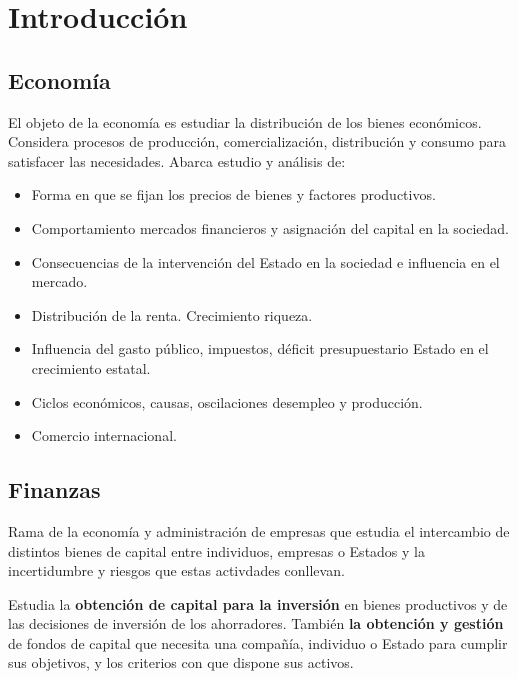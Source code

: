 \documentclass[
10pt, %
a4paper, %
oneside, %
headinclude,footinclude, %
BCOR5mm, %
]{scrartcl}
\newcommand{\n}[1]{\textbf{#1}}
\newcounter{ex}
\begin{document}
\pagestyle{scrheadings} %

\newpage
\tableofcontents
\newpage




\section*{Introducción}

	\subsection*{Economía}
		El objeto de la economía es estudiar la distribución de los bienes económicos. Considera procesos de producción, comercialización, distribución y consumo para satisfacer las necesidades. Abarca estudio y análisis de:
		\begin{itemize}
			\item Forma en que se fijan los precios de bienes y factores productivos.
			\item Comportamiento mercados financieros y asignación del capital en la sociedad.
			\item Consecuencias de la intervención del Estado en la sociedad e influencia en el mercado.
			\item Distribución de la renta. Crecimiento riqueza.
			\item Influencia del gasto público, impuestos, déficit presupuestario Estado en el crecimiento estatal.
			\item Ciclos económicos, causas, oscilaciones desempleo y producción.
			\item Comercio internacional.
		\end{itemize}

	\subsection*{Finanzas}

		Rama de la economía y administración de empresas que estudia el intercambio de distintos bienes de capital entre individuos, empresas o Estados y la incertidumbre y riesgos que estas activdades conllevan.

		Estudia la \n{obtención de capital para la inversión} en bienes productivos y de las decisiones de inversión de los ahorradores. También \n{la obtención y gestión} de fondos de capital que necesita una compañía, individuo o Estado para cumplir sus objetivos, y los criterios con que dispone sus activos.
\end{document}
